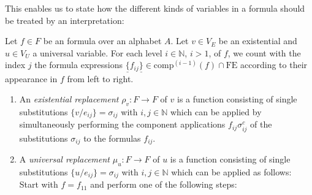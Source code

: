 This enables us to state how the different kinds of variables in a formula should be treated by an interpretation:




\begin{definition}[Replacements]\label{repl}
Let $f\in F$ be an \nthree formula over an alphabet $A$. Let $v\in V_E$ be an existential and $u\in V_U$ a universal variable. 
For each level $i\in \mathbb{N}$, $i>1$, of $f$, we count with the index $j$ the formula expressions $\underline{\texttt{\{}} f_{ij}\underline{\texttt{\}}}\in \text{comp}^{(i-1)}(f)\cap \text{FE}$ according to
their appearance in $f$ from left to right.


\begin{enumerate}


 \item 
 An \emph{existential replacement} $\rho_v:F\rightarrow F$ of $v$ is a function consisting of single 
 substitutions $ \{v/e_{ij}\}=\sigma_{ij}$ with $i,j\in \mathbb{N}$ %
 which can be applied by simultaneously performing the component applications $f_{ij}\sigma_{ij}^c$ of the substitutions $\sigma_{ij}$ to the formulas $f_{ij}$. 
  
 \item \label{ur} A \emph{universal replacement}  $\mu_u:F\rightarrow F$ of $u$ is a function consisting of 
 single substitutions $\{u/e_{ij}\}=\sigma_{ij}$ with $i,j \in \mathbb{N}$ %
 which can be applied as follows:\\
 Start with $f=f_{11}$ and perform one of the following steps:
 \begin{enumerate}
 

\end{enumerate}
\end{enumerate}
\end{definition}
